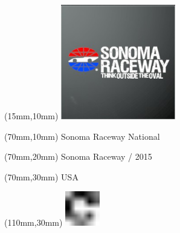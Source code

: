 \null\newpage
\begin{textblock*}{50mm}(15mm,10mm)%
\includegraphics[width=50mm]{LG/2015-05-20_00096.png}
\end{textblock*}
\begin{textblock*}{130mm}(70mm,10mm)%
{\fontsize{20}{20}\selectfont Sonoma Raceway National}\\
\end{textblock*}
\begin{textblock*}{120mm}(70mm,20mm)%
{\fontsize{16}{16}\selectfont Sonoma Raceway / 2015}\\
\end{textblock*}
\begin{textblock*}{120mm}(70mm,30mm)%
{\fontsize{12}{12}\selectfont USA}
\end{textblock*}
\begin{textblock*}{30mm}(110mm,30mm)%
\centering
\includegraphics[height=15mm]{icons/fa-rotate-right.pdf}
\end{textblock*}
